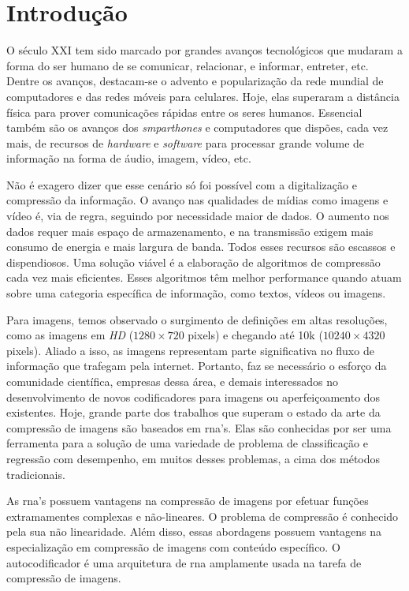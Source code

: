 \chapter{Introdução}

O século XXI tem sido marcado por grandes avanços tecnológicos que mudaram a forma do ser humano de se comunicar, relacionar, e informar, entreter, etc. Dentre os avanços, destacam-se o advento e popularização da rede mundial de computadores e das redes móveis para celulares. Hoje, elas superaram a distância física para prover  comunicações rápidas entre os seres humanos. Essencial também são os avanços dos \textit{smparthones} e computadores que dispões, cada vez mais, de recursos de \textit{hardware} e \textit{software} para processar grande volume de informação na forma de áudio, imagem, vídeo, etc.

Não é exagero dizer que esse cenário só foi possível com a digitalização e compressão da informação. O avanço nas qualidades de mídias como imagens e vídeo é, via de regra, seguindo por necessidade maior de dados. 
O aumento nos dados requer mais espaço de armazenamento, e na transmissão exigem mais consumo de energia e mais largura de banda. Todos esses recursos são escassos e dispendiosos. Uma solução viável é a elaboração  de algoritmos de compressão cada vez mais eficientes. Esses algoritmos têm melhor performance quando atuam sobre uma categoria específica de informação, como textos, vídeos ou imagens.    

Para imagens, temos observado o surgimento de definições em altas resoluções, como as imagens em \textit{HD} ($1280 \times 720$ pixels) e chegando até  10k ($10240 \times 4320 $ pixels). Aliado a isso, as imagens representam parte significativa no fluxo de informação que trafegam pela internet. 
Portanto, faz se necessário o esforço da comunidade científica, empresas dessa área, e demais interessados no desenvolvimento de novos codificadores para imagens ou aperfeiçoamento dos existentes. Hoje, grande parte dos trabalhos que superam o estado da arte da compressão de imagens são baseados em \gls{rna}'s. Elas são conhecidas por ser uma ferramenta para a solução de uma variedade de problema de classificação e regressão com desempenho, em muitos desses problemas, a cima dos métodos tradicionais.

As \acrshort{rna}'s possuem vantagens na compressão de imagens por efetuar funções extramamentes complexas e não-lineares. O problema de compressão é conhecido pela sua não linearidade.  Além disso, essas abordagens possuem vantagens na especialização em compressão de imagens com conteúdo específico. O autocodificador é uma arquitetura de \acrshort{rna} amplamente usada na tarefa de compressão de imagens. 

